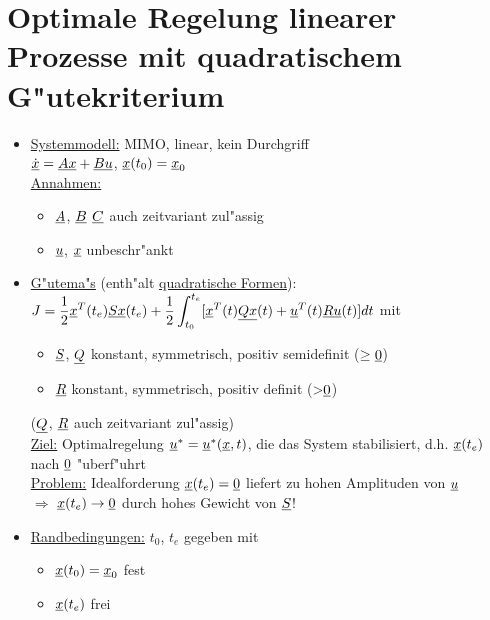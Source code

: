 \documentclass[openany,a4paper,11pt]{book}
\begin{document}
\section{Optimale Regelung linearer Prozesse mit quadratischem G"utekriterium}
\begin{itemize}
    \item \uline{Systemmodell:} MIMO, linear, kein Durchgriff\\
    $\uline{\dot{x}}=\uline{Ax}+\uline{Bu}$, \quad $\uline{x}(t_0)=\uline{x}_0$\\
    \uline{Annahmen:} \begin{itemize}
        \item $\uline{A}$, $\uline{B}$ $\uline{C}$ auch zeitvariant zul"assig
        \item $\uline{u}$, $\uline{x}$ unbeschr"ankt
    \end{itemize}
    \item \uline{G"utema"s} (enth"alt \uline{quadratische Formen}):\\
    $\displaystyle J=\frac{1}{2}\uline{x}^T(t_e)\uline{Sx}(t_e)+\frac{1}{2}\int_{t_0}^{t_e}[\uline{x}^T(t)\uline{Qx}(t)+\uline{u}^T(t)\uline{Ru}(t)]dt$ \quad mit \begin{itemize}
    \item $\uline{S}$, $\uline{Q}$ konstant, symmetrisch, positiv semidefinit ($\ge \uline{0}$)
    \item $\uline{R}$ konstant, symmetrisch, positiv definit (>$\uline{0}$)
\end{itemize}
\quad \quad ($\uline{Q}$, $\uline{R}$ auch zeitvariant zul"assig)\\
\uline{Ziel:} Optimalregelung $\uline{u}^*=\uline{u}^*(\uline{x},t)$, die das System stabilisiert, d.h. $\uline{x}(t_e)$ nach $\uline{0}$ "uberf"uhrt\\
\uline{Problem:} Idealforderung $\uline{x}(t_e)=\uline{0}$ liefert zu hohen Amplituden von $\uline{u}$ \\
$\Rightarrow$ $\uline{x}(t_e)\rightarrow\uline{0}$ durch hohes Gewicht von $\uline{S}$!
    \item \uline{Randbedingungen:} $t_0$, $t_e$ gegeben mit \begin{itemize}
        \item $\uline{x}(t_0)=\uline{x}_0$ fest
        \item $\uline{x}(t_e)$ frei
    \end{itemize}
\end{itemize}
\end{document}
